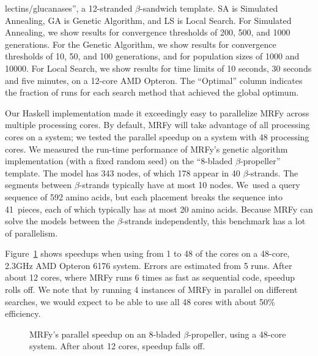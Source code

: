 \documentclass{acm_proc_article-sp}
\begin{document}
\begin{small}
\begin{center}
\begin{table}[!t]
{lectins/glucanases'', a 12-stranded $\beta$-sandwich template. 
SA is Simulated Annealing, GA is Genetic Algorithm, and LS is Local
Search. 
For Simulated Annealing, we show results for convergence thresholds of
200, 500, and 1000 generations. 
For the Genetic Algorithm, we show results for convergence thresholds of 10, 
50, and 100 generations, and for population sizes of 1000 and 10000.
For Local Search, we show results for time limits of 10 seconds, 30 seconds and 
five minutes, on a 12-core AMD Opteron.
The ``Optimal'' column indicates the fraction of runs for each search method
that achieved the global optimum.}
\end{table}
\end{center}
\end{small}




Our Haskell implementation made it exceedingly easy to parallelize MRFy across
multiple processing cores.
By default, MRFy will take advantage of all processing cores on a system; we
tested the parallel speedup on a system with 48 processing cores.
We measured the run-time performance of MRFy's genetic algorithm implementation
(with a fixed random seed) on the ``8-bladed $\beta$-propeller'' template.
The model has 343 nodes, of which 178 appear in 40 $\beta$-strands.
The segments between $\beta$-strands typically have at most 10 nodes.
We~used a query sequence of 592 amino acids, but each placement breaks
the sequence into 41~pieces, each of which typically has at most 20 amino
acids.
Because MRFy can solve the models between the $\beta$-strands independently,
this benchmark has a lot of parallelism.

Figure~\ref{speedup} shows speedups when using from 
 1 to 48 of the cores 
on a 48-core, 2.3GHz AMD Opteron 6176 system.
Errors are estimated from 5 runs.
After about 12 cores, where MRFy runs 6 times as fast as sequential code, 
speedup rolls off.
We note that by running 4 instances of MRFy in parallel on different searches,
we would expect to be able to use all 48 cores with about 50\% efficiency.

\begin{figure}[htb!]
\begin{center}
   \caption{MRFy's parallel speedup on an 8-bladed $\beta$-propeller, using a
   48-core system.
   After about 12 cores, speedup falls off.}
   \label{speedup}
 \end{center}
\end{figure}
\end{document}
